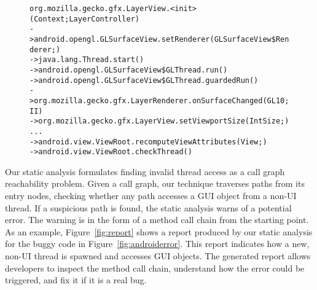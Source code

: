 \begin{figure}[t]
\begin{CodeOut}
\begin{alltt}
   org.mozilla.gecko.gfx.LayerView.<init>(Context;LayerController)
-> android.opengl.GLSurfaceView.setRenderer(GLSurfaceView\$Renderer;)
-> java.lang.Thread.start()
-> android.opengl.GLSurfaceView\$GLThread.run()
-> android.opengl.GLSurfaceView\$GLThread.guardedRun()
-> org.mozilla.gecko.gfx.LayerRenderer.onSurfaceChanged(GL10;II)
-> org.mozilla.gecko.gfx.LayerView.setViewportSize(IntSize;)
   ... 
-> android.view.ViewRoot.recomputeViewAttributes(View;)
-> android.view.ViewRoot.checkThread()
\end{alltt}
\end{CodeOut}
\vspace*{-15pt}
\end{figure}

Our static analysis formulates finding invalid thread access as a call graph reachability
problem. Given a call graph, our technique traverses
paths from its entry nodes, checking whether
any path accesses a GUI object from a non-UI thread. If 
a suspicious path is found, the static analysis warns of a potential error.
The warning is in the form of a method
call chain from the starting point.
As an example, Figure~\ref{fig:report} shows a report produced
by our static analysis for the buggy code in Figure~\ref{fig:androiderror}.
This report indicates how a new, non-UI thread is spawned and
accesses GUI objects. The generated report allows  developers to
inspect the method call chain, understand how the error
could be triggered, and fix it if it is a real bug.

